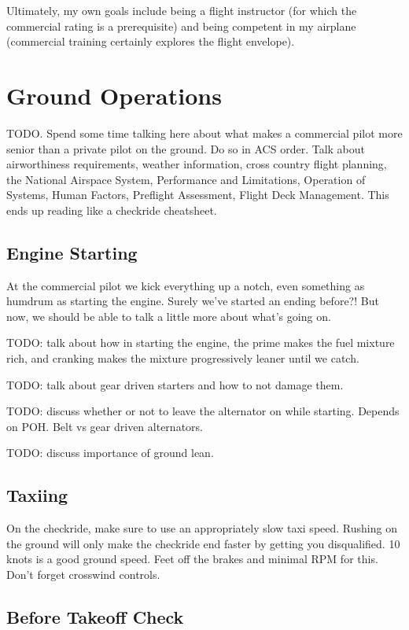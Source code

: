 Ultimately, my own goals include being a flight instructor (for which the commercial rating is a prerequisite) and being competent in my airplane (commercial training certainly explores the flight envelope).

\section{Ground Operations}

TODO. Spend some time talking here about what makes a commercial pilot more senior than a private pilot on the ground. Do so in ACS order. Talk about airworthiness requirements, weather information, cross country flight planning, the National Airspace System, Performance and Limitations, Operation of Systems, Human Factors, Preflight Assessment, Flight Deck Management. This ends up reading like a checkride cheatsheet.

\subsection{Engine Starting}

At the commercial pilot we kick everything up a notch, even something as humdrum as starting the engine. Surely we've started an ending before?! But now, we should be able to talk a little more about what's going on.

TODO: talk about how in starting the engine, the prime makes the fuel mixture rich, and cranking makes the mixture progressively leaner until we catch.

TODO: talk about gear driven starters and how to not damage them.

TODO: discuss whether or not to leave the alternator on while starting. Depends on POH. Belt vs gear driven alternators.

TODO: discuss importance of ground lean.

\subsection{Taxiing}

On the checkride, make sure to use an appropriately slow taxi speed. Rushing on the ground will only make the checkride end faster by getting you disqualified. 10 knots is a good ground speed. Feet off the brakes and minimal RPM for this. Don't forget crosswind controls.

\subsection{Before Takeoff Check}

